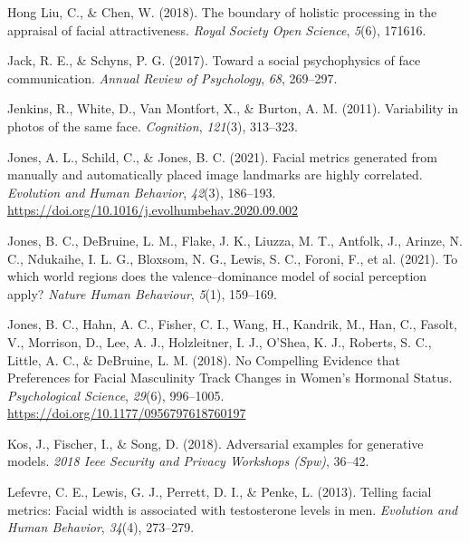 \documentclass[
  doc,floatsintext]{apa6}
\newlength{\cslhangindent}
\newlength{\cslentryspacingunit} %
\newenvironment{CSLReferences}[2] %
 {%
  \setlength{\parindent}{0pt}
  \ifodd #1
  \let\oldpar\par
  \def\par{\hangindent=\cslhangindent\oldpar}
  \fi
  \setlength{\parskip}{#2\cslentryspacingunit}
 }%
 {}
\begin{document}
\begin{CSLReferences}{1}{0}
\leavevmode{}%
Hong Liu, C., \& Chen, W. (2018). The boundary of holistic processing in the appraisal of facial attractiveness. \emph{Royal Society Open Science}, \emph{5}(6), 171616.

\leavevmode{}%
Jack, R. E., \& Schyns, P. G. (2017). Toward a social psychophysics of face communication. \emph{Annual Review of Psychology}, \emph{68}, 269--297.

\leavevmode{}%
Jenkins, R., White, D., Van Montfort, X., \& Burton, A. M. (2011). Variability in photos of the same face. \emph{Cognition}, \emph{121}(3), 313--323.

\leavevmode{}%
Jones, A. L., Schild, C., \& Jones, B. C. (2021). Facial metrics generated from manually and automatically placed image landmarks are highly correlated. \emph{Evolution and Human Behavior}, \emph{42}(3), 186--193. \url{https://doi.org/10.1016/j.evolhumbehav.2020.09.002}

\leavevmode{}%
Jones, B. C., DeBruine, L. M., Flake, J. K., Liuzza, M. T., Antfolk, J., Arinze, N. C., Ndukaihe, I. L. G., Bloxsom, N. G., Lewis, S. C., Foroni, F., et al. (2021). To which world regions does the valence--dominance model of social perception apply? \emph{Nature Human Behaviour}, \emph{5}(1), 159--169.

\leavevmode{}%
Jones, B. C., Hahn, A. C., Fisher, C. I., Wang, H., Kandrik, M., Han, C., Fasolt, V., Morrison, D., Lee, A. J., Holzleitner, I. J., O'Shea, K. J., Roberts, S. C., Little, A. C., \& DeBruine, L. M. (2018). No {Compelling} {Evidence} that {Preferences} for {Facial} {Masculinity} {Track} {Changes} in {Women}'s {Hormonal} {Status}. \emph{Psychological Science}, \emph{29}(6), 996--1005. \url{https://doi.org/10.1177/0956797618760197}

\leavevmode{}%
Kos, J., Fischer, I., \& Song, D. (2018). Adversarial examples for generative models. \emph{2018 Ieee Security and Privacy Workshops (Spw)}, 36--42.

\leavevmode{}%
Lefevre, C. E., Lewis, G. J., Perrett, D. I., \& Penke, L. (2013). Telling facial metrics: Facial width is associated with testosterone levels in men. \emph{Evolution and Human Behavior}, \emph{34}(4), 273--279.


\end{CSLReferences}
\end{document}
